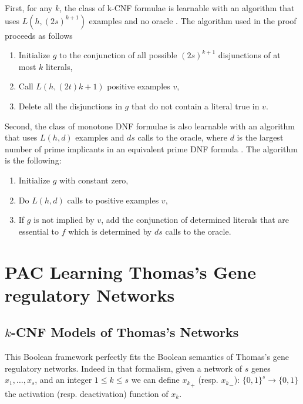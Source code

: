 \documentclass{llncs}
\begin{document}
First, for any $k$, the class of k-CNF formulae is learnable with an
algorithm that uses $L(h,(2s)^{k+1})$ examples and no oracle \cite{Valiant84cacm}.
The algorithm used in the proof proceeds as follows
\begin{enumerate}
  \item Initialize $g$ to the conjunction of all possible $(2s)^{k+1}$ disjunctions of at most $k$ literals,
\item Call $L(h,(2t)k+1)$ positive examples $v$,
\item Delete all the disjunctions in $g$ that do not contain a literal true in $v$.
\end{enumerate}


    Second, the class of monotone DNF formulae is also learnable with an algorithm that uses $L(h,d)$ examples and $ds$ calls to the oracle,
    where $d$ is the largest number of prime implicants in an equivalent prime DNF formula \cite{Valiant84cacm}.
The algorithm is the following:
\begin{enumerate}
\item Initialize $g$ with constant zero,
\item
Do $L(h,d)$ calls to positive examples $v$,
\item
If $g$ is not implied by $v$, add the conjunction of determined literals that are essential to $f$ which is determined by $ds$ calls to the oracle.
\end{enumerate}

\section{PAC Learning Thomas's Gene regulatory Networks}

\subsection{$k$-CNF Models of Thomas's Networks}

  This Boolean framework perfectly fits the Boolean semantics of Thomas's gene regulatory networks.
  Indeed in that formalism, given a network of $s$ genes $x_1,\ldots,x_s$, and an integer $1 \leq k \leq s$ we can define ${x_k}_+$ (resp. ${x_k}_-$): $\{0,1\}^s \rightarrow\{0,1\}$ the activation (resp. deactivation) function of $x_k$.
  
\end{document}
